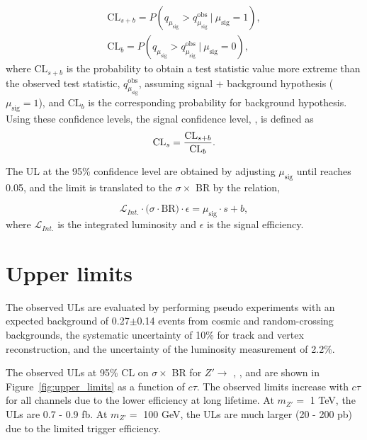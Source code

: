 \begin{align}
\mathrm{CL}_{s+b} = P(q_{\mu_{\mathrm{sig}}} > q_{\mu_{\mathrm{sig}}}^{\mathrm{obs}}~|~\mu_{\mathrm{sig}} = 1), \nonumber \\
\mathrm{CL}_{b} = P(q_{\mu_{\mathrm{sig}}} > q_{\mu_{\mathrm{sig}}}^{\mathrm{obs}}~|~\mu_{\mathrm{sig}} = 0),
\label{eq:p_values}
\end{align}
%
where $\mathrm{CL}_{s+b}$ is the probability to obtain a test statistic value more extreme than the observed test statistic, $q_{\mu_{\mathrm{sig}}}^{\mathrm{obs}}$, assuming signal + background hypothesis ($\mu_{\mathrm{sig}}=1$), and $\mathrm{CL}_{b}$ is the corresponding probability for background hypothesis. Using these confidence levels, the signal confidence level, \CLs, is defined as
\begin{align}
\mathrm{CL}_{s} =  \dfrac{\mathrm{CL}_{s+b}}{\mathrm{CL}_{b}}.
\label{eq:cls}
\end{align}

The UL at the 95\% confidence level are obtained by adjusting $\mu_{\mathrm{sig}}$ until \CLs reaches 0.05, and the limit is translated to the $\sigma \times$ BR by the relation,

\begin{equation}
\label{eq:signal_strength}
\mathcal{L}_{Int.} \cdot \big(\sigma \cdot \mathrm{BR} \big) \cdot \epsilon = \mu_{\mathrm{sig}}\cdot s + b,
\end{equation}
%
where $\mathcal{L}_{Int.}$ is the integrated luminosity and  $\epsilon$ is the signal efficiency.

\section{Upper limits}
The observed ULs are evaluated by performing pseudo experiments with an expected background of 0.27$\pm$0.14 events from cosmic and random-crossing backgrounds, the systematic uncertainty of 10\% for track and vertex reconstruction, and the uncertainty of the luminosity measurement of 2.2\%.

The observed ULs at 95\% CL on $\sigma \times$ BR for $Z' \rightarrow$ \mumu, \ee, and \emu are shown in Figure~\ref{fig:upper_limits} as a function of $c\tau$. The observed limits increase with $c\tau$ for all channels due to the lower efficiency at long lifetime. At $m_{Z'}=$ 1 TeV, the ULs are 0.7 - 0.9 fb. At $m_{Z'}=$ 100 GeV, the ULs are much larger (20 - 200 pb) due to the limited trigger efficiency.


